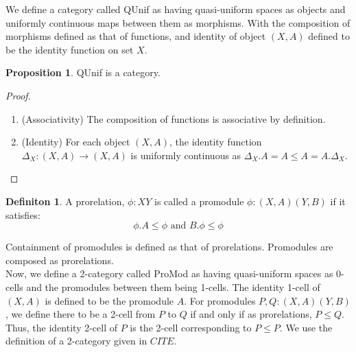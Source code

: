 \documentclass[18pt,a4paper]{article}
\makeatletter
\theoremstyle{definition}
\newtheorem{definition}[theorem]{Definiton}
\newtheorem{proop}[theorem]{Proposition}
\newcommand{\carrow}{}%
\DeclareRobustCommand{\carrow}{%
	\mathrel{\vphantom{\rightarrow}\mathpalette\circle@arrow\relax}%
}
\newcommand{\circle@arrow}[2]{%
	\m@th
	\ooalign{%
		\hidewidth$#1\circ\mkern1mu$\hidewidth\cr
	$#1\longrightarrow$\cr}%
}
\makeatother
\begin{document}
We define a category called QUnif as having quasi-uniform spaces as objects
and uniformly continuous maps between them as morphisms.
With the composition of morphisms defined as that of functions, and identity of object $(X,A)$
defined to be the identity function on set $X$.
\begin{proop} QUnif is a category.\end{proop}
\begin{proof}\setcounter{equation}{0}
	\begin{enumerate}[label=(\roman*)]
		\item (Associativity) The composition of functions is associative by definition.
		\item (Identity) For each object $(X,A)$, the identity function
			$\Delta_X:(X,A) \to (X,A)$ is uniformly continuous as
			$\Delta_X.A=A \leq A=A.\Delta_X$.
			\qedhere
	\end{enumerate}
\end{proof}
\begin{definition}%
	A prorelation, $\phi:X \carrow Y$ is called a promodule $\phi: (X,A) \carrow (Y,B)$  if it
	satisfies:
	\[ \phi.A \leq \phi \text{ and } B. \phi \leq \phi \]
\end{definition}


	Containment of promodules is defined as that of prorelations.
	Promodules are composed as prorelations.\\

Now, we define a 2-category called ProMod as having quasi-uniform spaces as 0-cells and the
promodules between them being 1-cells. The identity 1-cell of $(X,A)$ is defined to be the
promodule $A$.
For promodules $P,Q: (X,A) \carrow (Y,B)$,
we define there to be a 2-cell from $P$ to $Q$ if and only if as prorelations, $P \leq Q$.
Thus, the identity 2-cell of $P$ is the 2-cell corresponding to $P\leq P$.
We use the definition of a 2-category given in $CITE$.
\end{document}
